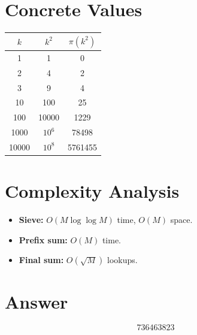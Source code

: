 \documentclass[11pt]{article}
\begin{document}
\section{Concrete Values}

\begin{center}
\begin{tabular}{ccc}
\toprule
$k$ & $k^2$ & $\pi(k^2)$ \\
\midrule
1   & 1         & 0 \\
2   & 4         & 2 \\
3   & 9         & 4 \\
10  & 100       & 25 \\
100 & 10000     & 1229 \\
1000 & $10^6$   & 78498 \\
10000 & $10^8$  & 5761455 \\
\bottomrule
\end{tabular}
\end{center}

\section{Complexity Analysis}

\begin{itemize}
\item \textbf{Sieve:} $O(M \log\log M)$ time, $O(M)$ space.
\item \textbf{Prefix sum:} $O(M)$ time.
\item \textbf{Final sum:} $O(\sqrt{M})$ lookups.
\end{itemize}

\section{Answer}

\[
\boxed{736463823}
\]
\end{document}
